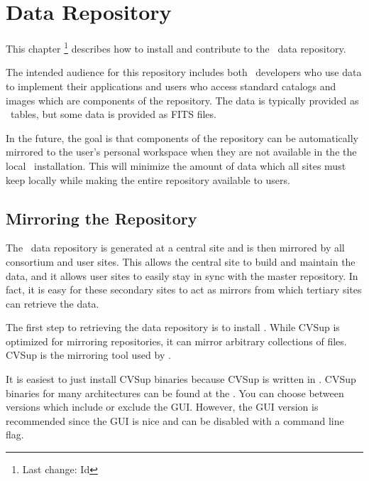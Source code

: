 \chapter{Data Repository}
\label{data repository}

This chapter \footnote{Last change:
$ $Id$ $}
describes how to install and contribute to the \aipspp\ data repository.

The intended audience for this repository includes both \aipspp\ developers
who use data to implement their applications and users who access standard
catalogs and images which are components of the repository. The data is
typically provided as \aipspp\ tables, but some data is provided as FITS
files.

In the future, the goal is that components of the repository can be
automatically mirrored to the user's personal workspace when they are not
available in the the local \aipspp\ installation. This will minimize the
amount of data which all sites must keep locally while making the entire
repository available to users.


\section{Mirroring the Repository}
\label{data repository mirroring}

The \aipspp\ data repository is generated at a central site and is then
mirrored by all consortium and user sites. This allows the central site
to build and maintain the data, and it allows user sites to easily stay
in sync with the master repository. In fact, it is easy for these secondary
sites to act as mirrors from which tertiary sites can retrieve the data.

The first step to retrieving the data repository is to install
. While
CVSup is optimized for mirroring 
repositories, it can mirror arbitrary collections of files. CVSup is the mirroring
tool used by .

It is easiest to just install CVSup binaries because CVSup is written in
.
CVSup binaries for many architectures can be found at the
.
You can choose between versions which include or exclude the GUI. However, the GUI
version is recommended since the GUI is nice and can be disabled with a command
line flag.

